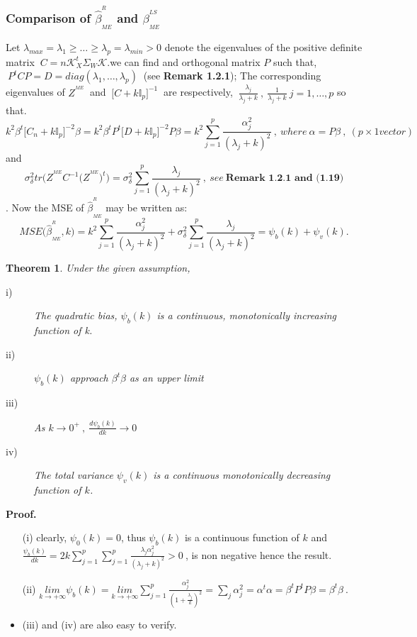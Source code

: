 \documentclass[12pt]{report}
\newtheorem{theoreme}{Theorem}[section] %
\begin{document}
 \subsubsection{Comparison of $\hat{\beta}^{^{R}}_{_{ME}}$ and $\beta^{^{LS}}_{_{ME}}$}
Let $\lambda_{max}=\lambda_{1}\geq \dots \geq \lambda_{p}=\lambda_{min}>0$ denote the eigenvalues of the positive definite matrix $\ C=n\mathcal{K}_{X}^{t}\Sigma_{W}\mathcal{K}$.we can find and orthogonal matrix $P$ such that,$\ P^{t}CP=D=diag(\lambda_{1},\dots,\lambda_{p})\ $ (see \textbf{Remark 1.2.1}); The corresponding eigenvalues of $Z^{^{ME}}\ $ and $\ \big[C+k\mathbb{I}_{p}\big]^{-1}\ $ are respectively, $\ \frac{\lambda_{j}}{\lambda_{j}+k}\ ,\ \frac{1}{\lambda_{j}+k}\ j=1,\dots,p$ so that.
	$$ k^{2}\beta^{t}\big[C_{n}+k\mathbb{I}_{p}\big]^{-2}\beta=k^{2}\beta^{t}P^{t}\big[D+k\mathbb{I}_{p}\big]^{-2}P\beta=k^{2}\sum_{j=1}^{p}\frac{\alpha_{j}^{2}}{(\lambda_{j}+k)^{2}}\ ,\ where\ \alpha=P\beta\ ,\ (p\times1 vector)$$
	and
	$$ \sigma_{\delta}^{2} tr\big(Z^{^{ME}}C^{-1}\big(Z^{^{ME}}\big)^{t}\big)=\sigma_{\delta}^{2} \sum_{j=1}^{p}\frac{\lambda_{j}}{(\lambda_{j}+k)^{2}}\ ,\ see\ \textbf{Remark 1.2.1 and (1.19)}$$.
	Now the MSE of $\hat{\beta}^{^{R}}_{_{ME}}$ may be written as:
	\begin{equation}
		MSE\big(\hat{\beta}^{^{R}}_{_{ME}},k\big)=k^{2}\sum_{j=1}^{p}\frac{\alpha_{j}^{2}}{(\lambda_{j}+k)^{2}}+\sigma_{\delta}^{2} \sum_{j=1}^{p}\frac{\lambda_{j}}{(\lambda_{j}+k)^{2}}=\psi_{b}(k)+\psi_{v}(k).
		\label{f60}
	\end{equation}
\begin{theoreme}
Under the given assumption,
\begin{description}
	\item[i)] The quadratic bias, $\psi_{b}(k)$ is a continuous, monotonically increasing function of k.
	\item[ii)] $\psi_{b}(k)$ approach $\beta^{t}\beta$ as an upper limit
	\item[iii)] As $k\rightarrow 0^{+} \ , \  \frac{d\psi_{b}(k)}{dk}\rightarrow 0$
	\item[iv)] The total variance $\psi_{v}(k)$ is a continuous monotonically decreasing function of $k$.
\end{description}
\end{theoreme}
\textbf{Proof.}
\begin{itemize}
	\item[(i)] clearly, $\psi_{0}(k)=0$, thus $\psi_{b}(k)$ is a continuous function of $k$ and $\frac{\psi_{b}(k)}{dk}=2k\sum_{j=1}^{p}\sum_{j=1}^{p}\frac{\lambda_{j}\alpha_{j}^{2}}{(\lambda_{j}+k)^{2}}>0\ $, is non negative hence the result.
	\item[(ii)] $\underset{k \rightarrow +\infty}{lim}\psi_{b}(k)=\underset{k \rightarrow +\infty}{lim}\sum_{j=1}^{p}\frac{\alpha_{j}^{2}}{(1+\frac{\lambda_{j}}{k})^{2}}=\sum_{j}\alpha_{j}^{2}=\alpha^{t}\alpha=\beta^{t}P^{t}P\beta=\beta^{t}\beta\ $.
	\item (iii) and (iv) are also easy to verify.
\end{itemize}
\end{document}
